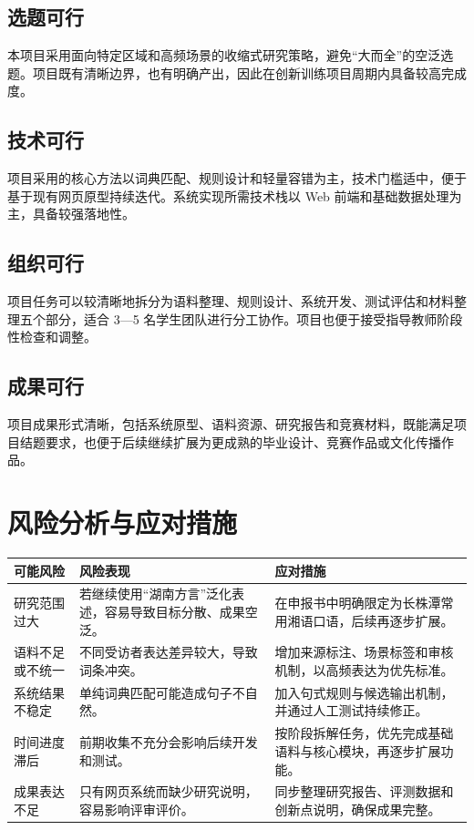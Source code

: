 \documentclass[12pt,a4paper]{ctexart}
\begin{document}
\subsection{选题可行}

本项目采用面向特定区域和高频场景的收缩式研究策略，避免“大而全”的空泛选题。项目既有清晰边界，也有明确产出，因此在创新训练项目周期内具备较高完成度。

\subsection{技术可行}

项目采用的核心方法以词典匹配、规则设计和轻量容错为主，技术门槛适中，便于基于现有网页原型持续迭代。系统实现所需技术栈以 Web 前端和基础数据处理为主，具备较强落地性。

\subsection{组织可行}

项目任务可以较清晰地拆分为语料整理、规则设计、系统开发、测试评估和材料整理五个部分，适合 3—5 名学生团队进行分工协作。项目也便于接受指导教师阶段性检查和调整。

\subsection{成果可行}

项目成果形式清晰，包括系统原型、语料资源、研究报告和竞赛材料，既能满足项目结题要求，也便于后续继续扩展为更成熟的毕业设计、竞赛作品或文化传播作品。

\section{风险分析与应对措施}

\begin{longtable}{p{4.2cm}p{5.2cm}p{4.6cm}}
\toprule
可能风险 & 风险表现 & 应对措施 \\
\midrule
研究范围过大 & 若继续使用“湖南方言”泛化表述，容易导致目标分散、成果空泛。 & 在申报书中明确限定为长株潭常用湘语口语，后续再逐步扩展。 \\
语料不足或不统一 & 不同受访者表达差异较大，导致词条冲突。 & 增加来源标注、场景标签和审核机制，以高频表达为优先标准。 \\
系统结果不稳定 & 单纯词典匹配可能造成句子不自然。 & 加入句式规则与候选输出机制，并通过人工测试持续修正。 \\
时间进度滞后 & 前期收集不充分会影响后续开发和测试。 & 按阶段拆解任务，优先完成基础语料与核心模块，再逐步扩展功能。 \\
成果表达不足 & 只有网页系统而缺少研究说明，容易影响评审评价。 & 同步整理研究报告、评测数据和创新点说明，确保成果完整。 \\
\bottomrule
\end{longtable}
\end{document}
